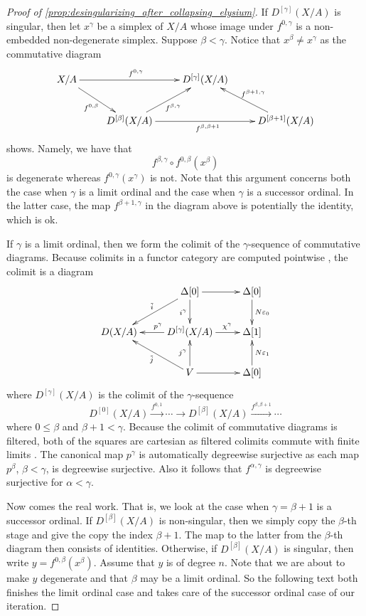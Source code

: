 \begin{proof}[Proof of \cref{prop:desingularizing_after_collapsing_elysium}]
If $D^{[\gamma ]}(X/A)$ is singular, then let $x^\gamma$ be a simplex of $X/A$ whose image under $f^{0,\gamma }$ is a non-embedded non-degenerate simplex. Suppose $\beta <\gamma$. Notice that $x^\beta \neq x^\gamma$ as the commutative diagram
\begin{displaymath}
 \xymatrix{
 X/A \ar[dr]_{f^{0,\beta }} \ar[rr]^{f^{0,\gamma }} && D^{[\gamma ]}(X/A) \\
 & D^{[\beta ]}(X/A) \ar[ur]_{f^{\beta ,\gamma }} \ar[rr]_{f^{\beta ,\beta +1}} && D^{[\beta +1]}(X/A) \ar[lu]_{f^{\beta +1,\gamma}}
 }
\end{displaymath}
shows. Namely, we have that
\[f^{\beta ,\gamma }\circ f^{0,\beta }(x^\beta )\]
is degenerate whereas $f^{0,\gamma }(x^\gamma )$ is not. Note that this argument concerns both the case when $\gamma$ is a limit ordinal and the case when $\gamma$ is a successor ordinal. In the latter case, the map $f^{\beta +1,\gamma }$ in the diagram above is potentially the identity, which is ok.

If $\gamma$ is a limit ordinal, then we form the colimit of the $\gamma$-sequence of commutative diagrams. Because colimits in a functor category are computed pointwise \cite[Section~V.3]{ML98}, the colimit is a diagram
\begin{displaymath}
\xymatrix{
& \Delta [0] \ar[ld]_{\tilde{i} } \ar[d]_{i^\gamma } \ar[r] & \Delta [0] \ar[d]^{N\varepsilon _0} \\
D(X/A) & D^{[\gamma ]}(X/A) \ar[l]_(.45){p^\gamma } \ar[r]^(.6){\chi ^\gamma } & \Delta [1] \\
& V \ar[lu]^{\tilde{j} } \ar[u]^{j^\gamma } \ar[r] & \Delta [0] \ar[u]_{N\varepsilon _1}
}
\end{displaymath}
where $D^{[\gamma ]}(X/A)$ is the colimit of the $\gamma$-sequence
\[D^{[0]}(X/A)\xrightarrow{f^{0,1}} \cdots \to D^{[\beta ]}(X/A)\xrightarrow{f^{\beta ,\beta +1}} \cdots\]
where $0\leq \beta$ and $\beta +1<\gamma$. Because the colimit of commutative diagrams is filtered, both of the squares are cartesian as filtered colimits commute with finite limits \cite[Section~IX.2]{ML98}. The canonical map $p^\gamma$ is automatically degreewise surjective as each map $p^\beta$, $\beta <\gamma$, is degreewise surjective. Also it follows that $f^{\alpha ,\gamma}$ is degreewise surjective for $\alpha <\gamma$.

Now comes the real work. That is, we look at the case when $\gamma =\beta +1$ is a successor ordinal. If $D^{[\beta ]}(X/A)$ is non-singular, then we simply copy the $\beta$-th stage and give the copy the index $\beta +1$. The map to the latter from the $\beta$-th diagram then consists of identities. Otherwise, if $D^{[\beta ]}(X/A)$ is singular, then write $y=f^{0,\beta }(x^\beta )$. Assume that $y$ is of degree $n$. Note that we are about to make $y$ degenerate and that $\beta$ may be a limit ordinal. So the following text both finishes the limit ordinal case and takes care of the successor ordinal case of our iteration.


\end{proof}
